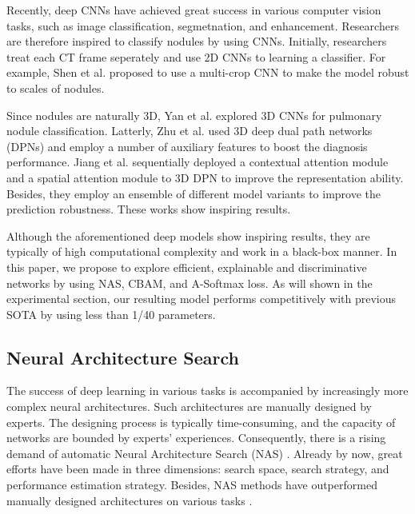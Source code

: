 \documentclass[final,5p,times,twocolumn]{elsarticle}
\begin{document}
Recently, deep CNNs have achieved great success in various computer vision tasks, such as image classification, segmetnation, and enhancement. Researchers are therefore inspired to classify nodules by using CNNs. Initially, researchers treat each CT frame seperately and use 2D CNNs to learning a classifier. For example, Shen et al. proposed to use a multi-crop CNN \cite{shen2017multi} to make the model robust to scales of nodules. 

Since nodules are naturally 3D, Yan et al. \cite{yan2016classification} explored 3D CNNs for pulmonary nodule classification. Latterly, Zhu et al. \cite{zhu2018deeplung} used 3D deep dual path networks (DPNs) and employ a number of auxiliary features to boost the diagnosis performance. Jiang et al. \cite{JIANG2019AEDPN} sequentially deployed a contextual attention module and a spatial attention module to 3D DPN to improve the representation ability. Besides, they employ an ensemble of different model variants to improve the prediction robustness. These works show inspiring results. 

Although the aforementioned deep models show inspiring results, they are typically of high computational complexity and work in a black-box manner. In this paper, we propose to explore efficient, explainable and discriminative networks by using NAS, CBAM, and A-Softmax loss. As will shown in the experimental section, our resulting model performs competitively with previous SOTA by using less than 1/40 parameters. 


\subsection{Neural Architecture Search}
\label{ssec:related-nas}

The success of deep learning in various tasks is accompanied by increasingly more complex neural architectures. Such architectures are manually designed by experts. The designing process is typically time-consuming, and the capacity of networks are bounded by experts' experiences. Consequently, there is a rising demand of automatic Neural Architecture Search (NAS) \citep{NAS2019JMLR}. Already by now, great efforts have been made in three dimensions: search space, search strategy, and performance estimation strategy. Besides, NAS methods have outperformed manually designed architectures on various tasks \citep{real2019aging}. 
\end{document}
